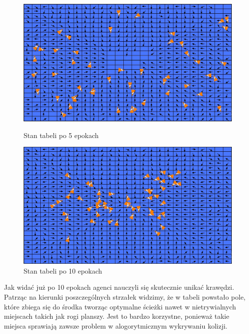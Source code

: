 \documentclass{article}
\begin{document}
\begin{figure}[H]
    \begin{minipage}[h]{0.48\textwidth}
        \centering
        \includegraphics[width=\textwidth]{4_Qtable_after_5rd_epoch.jpg}
        \caption{Stan tabeli po 5 epokach}
    \end{minipage}
    \hspace{0.02\textwidth}
    \begin{minipage}[h]{0.48\textwidth}
        \centering
        \includegraphics[width=\textwidth]{5_Qtable_after_10th_epoch.jpg}
        \caption{Stan tabeli po 10 epokach}
    \end{minipage}
\end{figure}

Jak widać już po 10 epokach agenci nauczyli się skutecznie unikać krawędzi. Patrząc na kierunki poszczególnych strzałek widzimy, że w tabeli powstało pole, które zbiega się do środka tworząc optymalne ścieżki nawet w nietrywialnych miejscach takich jak rogi planszy. Jest to bardzo korzystne, ponieważ takie miejsca sprawiają zawsze problem w alogorytmicznym wykrywaniu kolizji.
\end{document}
